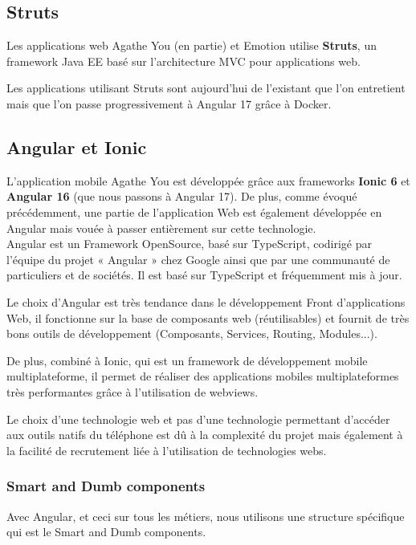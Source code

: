 \documentclass{article}
\begin{document}
\subsection{Struts}

Les applications web Agathe You (en partie) et Emotion utilise \textbf{Struts}, un framework Java EE basé sur l'architecture MVC pour applications web.

Les applications utilisant Struts sont aujourd'hui de l'existant que l'on entretient mais que l'on passe progressivement à Angular 17 grâce à Docker.

\subsection{Angular et Ionic}

L'application mobile Agathe You est développée grâce aux frameworks \textbf{Ionic 6} et \textbf{Angular 16} (que nous passons à Angular 17). 
De plus, comme évoqué précédemment, une partie de l'application Web est également développée en Angular mais vouée à passer entièrement sur cette technologie. \\

Angular est un Framework OpenSource, basé sur TypeScript, codirigé par l'équipe du projet « Angular » chez Google ainsi que par une communauté de particuliers et de sociétés.
Il est basé sur TypeScript et fréquemment mis à jour.

Le choix d'Angular est très tendance dans le développement Front d'applications Web, il fonctionne sur la base de composants web (réutilisables) et fournit de très bons outils de développement (Composants, Services, Routing, Modules...).

De plus, combiné à Ionic, qui est un framework de développement mobile multiplateforme, il permet de réaliser des applications mobiles multiplateformes très performantes grâce à l'utilisation de webviews.

Le choix d'une technologie web et pas d'une technologie permettant d'accéder aux outils natifs du téléphone est dû à la complexité du projet mais également à la facilité de recrutement liée à l'utilisation de technologies webs.

\subsubsection{Smart and Dumb components}
Avec Angular, et ceci sur tous les métiers, nous utilisons une structure spécifique qui est le Smart and Dumb components.
\end{document}
